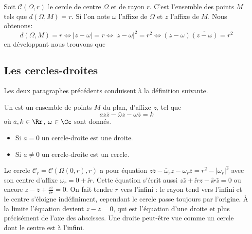 \documentclass[11pt,class=report,crop=false]{standalone}
\begin{document}
Soit $\mathcal{C}(\Omega,r)$ le cercle de centre $\Omega$ et de rayon $r$.
C'est l'ensemble des points $M$ tels que $d(\Omega,M)=r$. Si l'on note $\omega$ l'affixe
de $\Omega$ et $z$ l'affixe de $M$. Nous obtenons:
$$d(\Omega,M) = r \iff  |z-\omega|=r \iff |z-\omega|^2=r^2 \iff (z-\omega)\overline{(z-\omega)}=r^2$$
en développant nous trouvons que\\


\subsection{Les cercles-droites}

Les deux paragraphes précédents conduisent à la définition suivante.
\begin{proposition}
 Un  est un ensemble de points $M$ du plan, d'affixe $z$,
 tel que
$$az\bar z - \bar \omega z - \omega \bar z = k$$
 où $a,k \in \Rr$, $\omega \in \Cc$ sont donnés.
 \begin{itemize}
  \item Si $a=0$ un cercle-droite est une droite.
  \item Si $a\neq 0$ un cercle-droite est un cercle.
 \end{itemize}
\end{proposition}


\begin{exemple}
Le cercle $\mathcal{C}_r = \mathcal{C}(\Omega(0,r),r)$ a pour équation
$z\bar z - \bar \omega_r z - \omega_r \bar z = r^2-|\omega_r|^2$
avec son centre d'affixe $\omega_r = 0+\ii r$. Cette équation s'écrit aussi
$z\bar z +\ii rz-\ii r\bar z =0$ ou encore $z-\bar z + \frac{z\bar z}{\ii r} = 0$.
On fait tendre $r$  vers l'infini : le rayon tend vers l'infini et le centre s'éloigne indéfiniment, cependant le cercle passe toujours par l'origine. 
\`A la limite l'équation devient
$z-\bar z = 0$, qui est l'équation d'une droite et plus précisément de l'axe des abscisses.
Une droite peut-être vue comme un cercle dont le centre est à l'infini.
\end{exemple}
\end{document}
